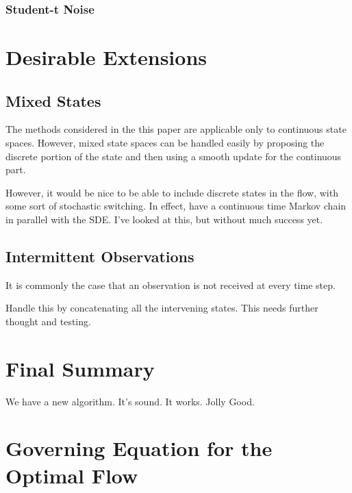 \documentclass[a4paper,10pt]{article}
\begin{document}
\subsubsection{Student-t Noise}



\section{Desirable Extensions}

\subsection{Mixed States}

The methods considered in the this paper are applicable only to continuous state spaces. However, mixed state spaces can be handled easily by proposing the discrete portion of the state and then using a smooth update for the continuous part.

{\meta However, it would be nice to be able to include discrete states in the flow, with some sort of stochastic switching. In effect, have a continuous time Markov chain in parallel with the SDE. I've looked at this, but without much success yet.}

\subsection{Intermittent Observations}

It is commonly the case that an observation is not received at every time step.

{\meta Handle this by concatenating all the intervening states. This needs further thought and testing.}



\section{Final Summary}

{\meta We have a new algorithm. It's sound. It works. Jolly Good.}





\appendix

\section{Governing Equation for the Optimal Flow} \label{app:optimal_flow_governing_eq}
\end{document}
